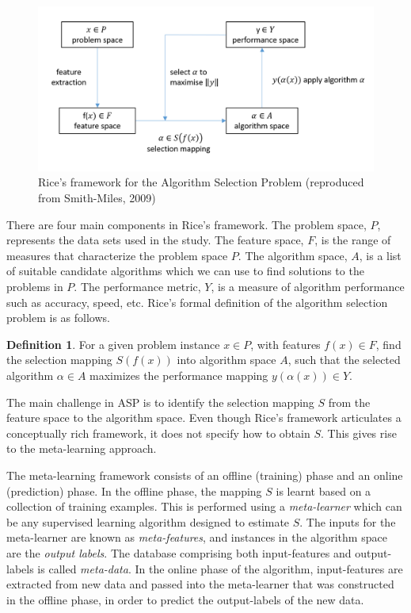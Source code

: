 \documentclass[11pt,a4paper,]{article}
\theoremstyle{definition}
\newtheorem{definition}{Definition}[section]
\theoremstyle{definition}
\theoremstyle{definition}
\theoremstyle{remark}
\begin{document}
\begin{figure}

{\centering \includegraphics[width=0.8\linewidth]{figures/RiceFramework} 

}

\caption{Rice's framework for the Algorithm Selection Problem (reproduced from Smith-Miles, 2009)}\label{fig:rice}
\end{figure}

There are four main components in Rice's framework. The problem space,
\(P\), represents the data sets used in the study. The feature space,
\(F\), is the range of measures that characterize the problem space
\(P\). The algorithm space, \(A\), is a list of suitable candidate
algorithms which we can use to find solutions to the problems in \(P\).
The performance metric, \(Y\), is a measure of algorithm performance
such as accuracy, speed, etc. Rice's formal definition of the algorithm
selection problem is \autocite{smith2009cross} as follows.

\begin{definition}
\label{def2}
For a given problem instance $x \in P$, with features $f(x) \in F$, find the selection mapping $S(f(x))$ into algorithm space $A$, such that the selected algorithm $\alpha \in A$ maximizes the performance mapping $y(\alpha(x)) \in Y$.
\end{definition}

The main challenge in ASP is to identify the selection mapping \(S\)
from the feature space to the algorithm space. Even though Rice's
framework articulates a conceptually rich framework, it does not specify
how to obtain \(S\). This gives rise to the meta-learning approach.

The meta-learning framework consists of an offline (training) phase and
an online (prediction) phase. In the offline phase, the mapping \(S\) is
learnt based on a collection of training examples. This is performed
using a \emph{meta-learner} which can be any supervised learning
algorithm designed to estimate \(S\). The inputs for the meta-learner
are known as \emph{meta-features}, and instances in the algorithm space
are the \emph{output labels}. The database comprising both
input-features and output-labels is called \emph{meta-data}. In the
online phase of the algorithm, input-features are extracted from new
data and passed into the meta-learner that was constructed in the
offline phase, in order to predict the output-labels of the new data.
\end{document}
